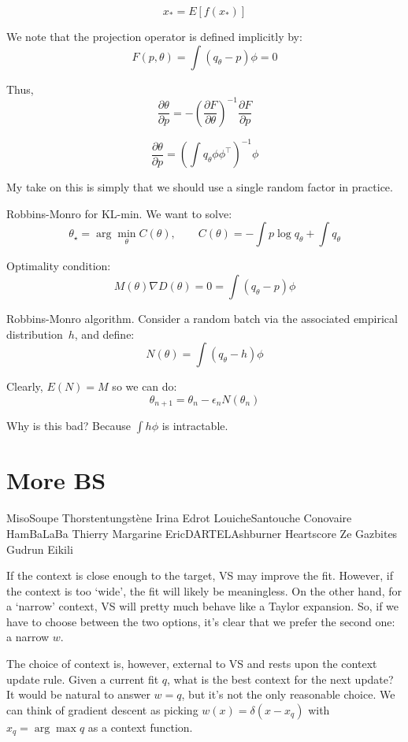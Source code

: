 \documentclass{article}
\begin{document}
$$
x_* = E[f(x_*)] 
$$

We note that the projection operator is defined implicitly by:
$$
F(p,\theta) = \int (q_\theta-p)\phi = 0
$$

Thus, 
$$
\frac{\partial \theta}{\partial p}
= - \left(\frac{\partial F}{\partial \theta}\right)^{-1} \frac{\partial F}{\partial p}
$$

$$
\frac{\partial \theta}{\partial p} = \left(\int q_\theta \phi\phi^\top \right)^{-1} \phi
$$


My take on this is simply that we should use a single random factor in practice. 

Robbins-Monro for KL-min. We want to solve:
$$
\theta_\star = \arg\min_\theta C(\theta),
\qquad
C(\theta) = -\int p \log q_\theta + \int q_\theta
$$

Optimality condition:
$$
M(\theta)\nabla D(\theta) = 0 = \int (q_\theta-p)\phi
$$

Robbins-Monro algorithm. Consider a random batch via the associated empirical distribution~$h$, and define:
$$
N(\theta) = \int (q_\theta-h) \phi
$$

Clearly, $E(N)=M$ so we can do:
$$
\theta_{n+1} = \theta_n - \epsilon_n N(\theta_n)
$$

Why is this bad? Because $\int h\phi$ is intractable.




\section{More BS}


MisoSoupe
Thorstentungstène
Irina
Edrot
LouicheSantouche
Conovaire
HamBaLaBa
Thierry Margarine
EricDARTELAshburner
Heartscore
Ze Gazbites
Gudrun Eikili

If the context is close enough to the target, VS may improve the fit. However, if the context is too `wide', the fit will likely be meaningless. On the other hand, for a `narrow' context, VS will pretty much behave like a Taylor expansion. So, if we have to choose between the two options, it's clear that we prefer the second one: a narrow $w$.

The choice of context is, however, external to VS and rests upon the context update rule. Given a current fit $q$, what is the best context for the next update? It would be natural to answer $w=q$, but it's not the only reasonable choice. We can think of gradient descent as picking $w(x)=\delta(x-x_q)$ with $x_q=\arg\max q$ as a context function.
\end{document}
